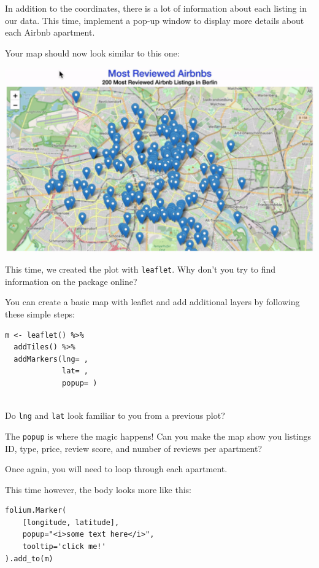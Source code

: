 \documentclass[
  11pt,
]{article}
\newenvironment{tips}[1]
  {
  \begin{itemize}
  \footnotesize
  \renewcommand{\labelitemi}{
    \raisebox{-.7\height}[0pt][0pt]{
      {\setkeys{Gin}{width=3em,keepaspectratio}
        \texttt{[image: images/\#1.png]}}
    }
  }
  \setlength{\fboxsep}{1em}
  \begin{rbox}
  \item
  }
  {
  \end{rbox}
  \end{itemize}
  }
\newenvironment{tipsp}[1]
  {
  \begin{itemize}
  \footnotesize
  \renewcommand{\labelitemi}{
    \raisebox{-.7\height}[0pt][0pt]{
      {\setkeys{Gin}{width=3em,keepaspectratio}
        \texttt{[image: images/\#1.png]}}
    }
  }
  \setlength{\fboxsep}{1em}
  \begin{pbox}
  \item
  }
  {
  \end{pbox}
  \end{itemize}
  }
\begin{document}
In addition to the coordinates, there is a lot of information about each listing in our data.
This time, implement a pop-up window to display more details about each Airbnb apartment.

Your map should now look similar to this one:

\begin{center}\includegraphics[width=1\linewidth]{plot/01_python/map_popup} \end{center}

\begin{tips}r
This time, we created the plot with \texttt{leaflet}.
Why don't you try to find information on the package online?

You can create a basic map with leaflet and add additional layers by following these simple steps:

\begin{verbatim}
m <- leaflet() %>%
  addTiles() %>% 
  addMarkers(lng= , 
             lat= , 
             popup= )
           
\end{verbatim}

Do \texttt{lng} and \texttt{lat} look familiar to you from a previous plot?

The \texttt{popup} is where the magic happens!
Can you make the map show you listings ID, type, price, review score, and number of reviews per apartment?

\end{tips}

\begin{tipsp}p

Once again, you will need to loop through each apartment.

This time however, the body looks more like this:

\begin{verbatim}
folium.Marker(
    [longitude, latitude], 
    popup="<i>some text here</i>", 
    tooltip='click me!'
).add_to(m)
\end{verbatim}


\end{tipsp}
\end{document}
